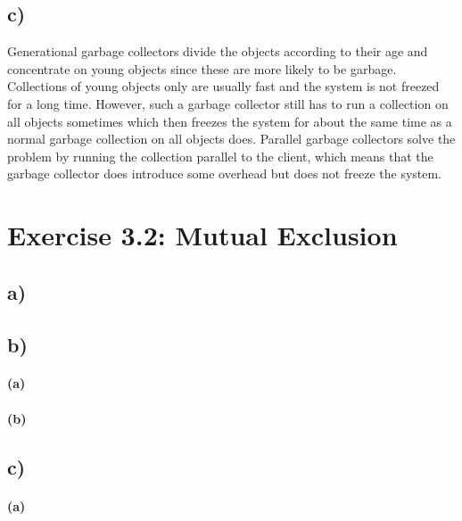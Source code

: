 \documentclass[12pt,a4paper]{article}
\begin{document}
\subsection*{c)} Generational garbage collectors divide the objects according to their age and concentrate on young objects since these are more likely to be garbage. Collections of young objects only are usually fast and the system is not freezed for a long time. However, such a garbage collector still has to run a collection on all objects sometimes which then freezes the system for about the same time as a normal garbage collection on all objects does.
Parallel garbage collectors solve the problem by running the collection parallel to the client, which means that the garbage collector does introduce some overhead but does not freeze the system.

\section*{Exercise 3.2: Mutual Exclusion}
  \subsection*{a)} %
  \subsection*{b)} %
    \paragraph*{(a)} %
    \paragraph*{(b)} %
  \subsection*{c)} %
    \paragraph*{(a)} %
\end{document}
